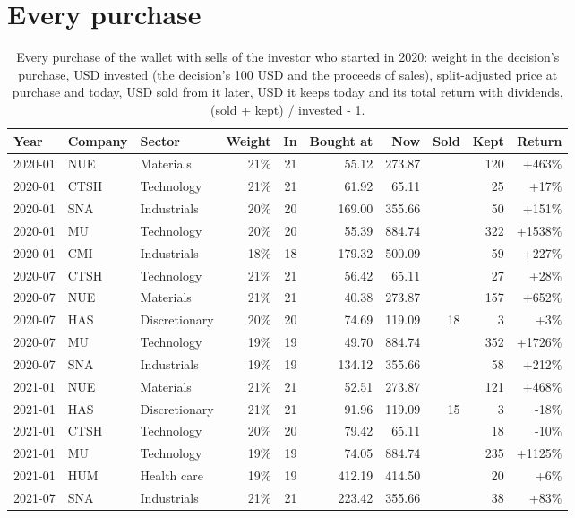 \documentclass[11pt,a4paper]{article}
\begin{document}
\section{Every purchase}
\label{app:purchases}
{\small
\begin{longtable}{l l l r r r r r r r}
\caption{Every purchase of the wallet with sells of the investor who started in 2020: weight in the decision's purchase, USD invested (the decision's 100 USD and the proceeds of sales), split-adjusted price at purchase and today, USD sold from it later, USD it keeps today and its total return with dividends, (sold + kept) / invested - 1.}\label{tab:purchases}\\
\hline
Year & Company & Sector & Weight & In & Bought at & Now & Sold & Kept & Return \\
\hline
\endhead
2020-01 & NUE & Materials & 21\% & 21 & 55.12 & 273.87 &  & 120 & +463\% \\
2020-01 & CTSH & Technology & 21\% & 21 & 61.92 & 65.11 &  & 25 & +17\% \\
2020-01 & SNA & Industrials & 20\% & 20 & 169.00 & 355.66 &  & 50 & +151\% \\
2020-01 & MU & Technology & 20\% & 20 & 55.39 & 884.74 &  & 322 & +1538\% \\
2020-01 & CMI & Industrials & 18\% & 18 & 179.32 & 500.09 &  & 59 & +227\% \\
2020-07 & CTSH & Technology & 21\% & 21 & 56.42 & 65.11 &  & 27 & +28\% \\
2020-07 & NUE & Materials & 21\% & 21 & 40.38 & 273.87 &  & 157 & +652\% \\
2020-07 & HAS & Discretionary & 20\% & 20 & 74.69 & 119.09 & 18 & 3 & +3\% \\
2020-07 & MU & Technology & 19\% & 19 & 49.70 & 884.74 &  & 352 & +1726\% \\
2020-07 & SNA & Industrials & 19\% & 19 & 134.12 & 355.66 &  & 58 & +212\% \\
2021-01 & NUE & Materials & 21\% & 21 & 52.51 & 273.87 &  & 121 & +468\% \\
2021-01 & HAS & Discretionary & 21\% & 21 & 91.96 & 119.09 & 15 & 3 & -18\% \\
2021-01 & CTSH & Technology & 20\% & 20 & 79.42 & 65.11 &  & 18 & -10\% \\
2021-01 & MU & Technology & 19\% & 19 & 74.05 & 884.74 &  & 235 & +1125\% \\
2021-01 & HUM & Health care & 19\% & 19 & 412.19 & 414.50 &  & 20 & +6\% \\
2021-07 & SNA & Industrials & 21\% & 21 & 223.42 & 355.66 &  & 38 & +83\% \\

\end{longtable}}
\end{document}
